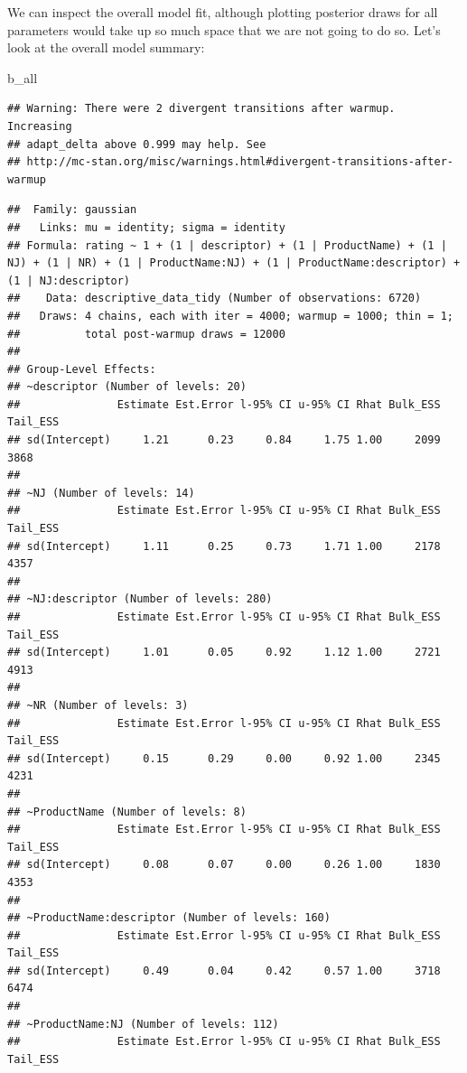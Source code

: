 \documentclass[
]{book}
\newenvironment{Shaded}{\begin{snugshade}}{\end{snugshade}}
\newcommand{\NormalTok}[1]{#1}
\begin{document}
We can inspect the overall model fit, although plotting posterior draws for all parameters would take up so much space that we are not going to do so. Let's look at the overall model summary:

\begin{Shaded}
\begin{Highlighting}[]
\NormalTok{b\_all}
\end{Highlighting}
\end{Shaded}

\begin{verbatim}
## Warning: There were 2 divergent transitions after warmup. Increasing
## adapt_delta above 0.999 may help. See
## http://mc-stan.org/misc/warnings.html#divergent-transitions-after-warmup
\end{verbatim}

\begin{verbatim}
##  Family: gaussian 
##   Links: mu = identity; sigma = identity 
## Formula: rating ~ 1 + (1 | descriptor) + (1 | ProductName) + (1 | NJ) + (1 | NR) + (1 | ProductName:NJ) + (1 | ProductName:descriptor) + (1 | NJ:descriptor) 
##    Data: descriptive_data_tidy (Number of observations: 6720) 
##   Draws: 4 chains, each with iter = 4000; warmup = 1000; thin = 1;
##          total post-warmup draws = 12000
## 
## Group-Level Effects: 
## ~descriptor (Number of levels: 20) 
##               Estimate Est.Error l-95% CI u-95% CI Rhat Bulk_ESS Tail_ESS
## sd(Intercept)     1.21      0.23     0.84     1.75 1.00     2099     3868
## 
## ~NJ (Number of levels: 14) 
##               Estimate Est.Error l-95% CI u-95% CI Rhat Bulk_ESS Tail_ESS
## sd(Intercept)     1.11      0.25     0.73     1.71 1.00     2178     4357
## 
## ~NJ:descriptor (Number of levels: 280) 
##               Estimate Est.Error l-95% CI u-95% CI Rhat Bulk_ESS Tail_ESS
## sd(Intercept)     1.01      0.05     0.92     1.12 1.00     2721     4913
## 
## ~NR (Number of levels: 3) 
##               Estimate Est.Error l-95% CI u-95% CI Rhat Bulk_ESS Tail_ESS
## sd(Intercept)     0.15      0.29     0.00     0.92 1.00     2345     4231
## 
## ~ProductName (Number of levels: 8) 
##               Estimate Est.Error l-95% CI u-95% CI Rhat Bulk_ESS Tail_ESS
## sd(Intercept)     0.08      0.07     0.00     0.26 1.00     1830     4353
## 
## ~ProductName:descriptor (Number of levels: 160) 
##               Estimate Est.Error l-95% CI u-95% CI Rhat Bulk_ESS Tail_ESS
## sd(Intercept)     0.49      0.04     0.42     0.57 1.00     3718     6474
## 
## ~ProductName:NJ (Number of levels: 112) 
##               Estimate Est.Error l-95% CI u-95% CI Rhat Bulk_ESS Tail_ESS

\end{verbatim}
\end{document}
